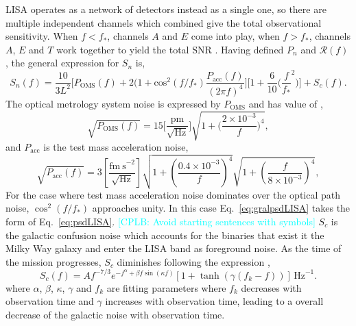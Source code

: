\documentclass[a4paper,12pt]{article}
\newcommand{\cplb}[1]{\textcolor{cyan}{[CPLB: #1]}}
\begin{document}
LISA operates as a network of detectors instead as a single one, so there are multiple independent channels which combined give the total observational sensitivity. When $f < f_{\ast}$, channels $A$ and $E$ come into play, when $f > f_{\ast}$, channels $A$, $E$ and $T$ work together to yield the total SNR \cite{prince2002lisa}.
Having defined $P_{n}$ and $\mathcal{R}(f)$, the general expression for $S_{n}$ is,
\begin{equation}
S_{n}(f) = \frac{10}{3L^{2}}\bigg[ P_{\mathrm{OMS}}(f) + 2 (1 + \text{cos}^{2}(f/f_{\ast})\frac{P_{\mathrm{acc}}(f)}{(2\pi f)^{4}}\bigg]\bigg[ 1 + \frac{6}{10}\bigg( \frac{f}{f_{\ast}}^{2} \bigg)\bigg] + S_{c}(f).
\label{eq:gralpsdLISA}
\end{equation}
The optical metrology system noise is expressed by $P_{\mathrm{OMS}}$ and has value of \cite{babak2021lisa},
\begin{equation}
\sqrt{P_{\mathrm{OMS}}(f)} = 15 \bigg[ \frac{\text{pm}}{\sqrt{\text{Hz}}}\bigg] \sqrt{1 + \bigg( \frac{2\times10^{-3}}{f} \bigg)^{4}}, 
\label{eq:poms}
\end{equation}
and $P_{\mathrm{acc}}$ is the test mass acceleration noise,
\begin{equation}
\sqrt{P_{\mathrm{acc}}(f)} = 3 \left[ \frac{\mathrm{fm~s}^{-2}}{\sqrt{\mathrm{Hz}}}\right] \sqrt{1 + \left( \frac{0.4\times10^{-3}}{f} \right)^{4}} \sqrt{1 + \left( \frac{f}{ 8\times10^{-3}} \right)^{4}}, 
\label{eq:pacc}
\end{equation}
For the case where test mass acceleration noise dominates over the optical path noise, $\cos^{2}(f/f_{\ast})$ approaches unity. In this case Eq.~\eqref{eq:gralpsdLISA}  takes the form of Eq.~\eqref{eq:psdLISA}. \cplb{Avoid starting sentences with symbols} $S_{c}$ is the galactic confusion noise which accounts for the binaries that exist it the Milky Way galaxy and enter the LISA band as foreground noise. As the time of the mission progresses, $S_{c}$ diminishes following the expression \cite{robson2019construction}, 
\begin{equation}
S_{c}(f) = A f^{-7/3} e^{-f^{\alpha} + \beta f \sin(\kappa f)} \left[1 + \tanh(\gamma(f_{k} - f))\right] \,\mathrm{Hz}^{-1}.
\label{eq:galacticconfusionnoise}
\end{equation}
where $\alpha$, $\beta$, $\kappa$, $\gamma$ and $f_{k}$ are fitting parameters where $f_{k}$ decreases with observation time and $\gamma$ increases with observation time, leading to a overall decrease of the galactic noise with observation time. 
\end{document}
